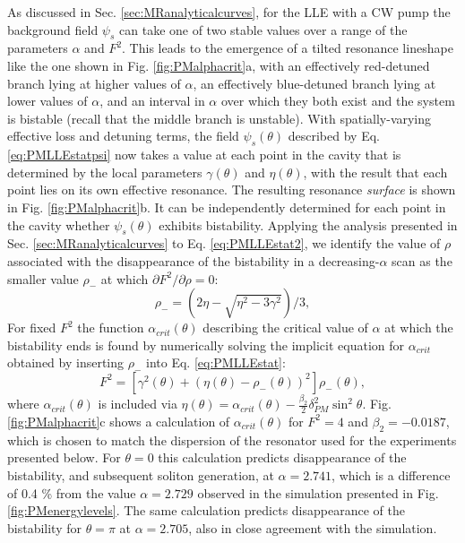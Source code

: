As discussed in Sec. \ref{sec:MRanalyticalcurves}, for the LLE with a CW pump the background field $\psi_s$ can take one of two stable values over a range of the parameters $\alpha$ and $F^2$. This leads to the emergence of a tilted resonance lineshape like the one shown in Fig. \ref{fig:PMalphacrit}a, with an effectively red-detuned branch lying at higher values of $\alpha$, an effectively blue-detuned branch lying at lower values of $\alpha$, and an interval in $\alpha$ over which they both exist and the system is bistable (recall that the middle branch is unstable). With spatially-varying effective loss and detuning terms, the field $\psi_s(\theta)$ described by Eq. \ref{eq:PMLLEstatpsi} now takes a value at each point in the cavity that is determined by the local parameters $\gamma(\theta)$ and $\eta(\theta)$, with the result that each point lies on its own effective resonance. The resulting resonance \textit{surface} is shown in Fig. \ref{fig:PMalphacrit}b. It can be independently determined for each point in the cavity whether $\psi_s(\theta)$ exhibits bistability. Applying the analysis presented in Sec. \ref{sec:MRanalyticalcurves} to Eq. \ref{eq:PMLLEstat2}, we identify the value of $\rho$ associated with the disappearance of the bistability in a decreasing-$\alpha$ scan as the smaller value $\rho_-$ at which $\partial F^2/\partial\rho=0$:
\begin{equation}
\rho_-=\left(2\eta-\sqrt{\eta^2-3\gamma^2}\right)/3,
\end{equation}
For fixed $F^2$ the function $\alpha_{crit}(\theta)$ describing the critical value of $\alpha$ at which the bistability ends is found by numerically solving the implicit equation for $\alpha_{crit}$ obtained by inserting $\rho_-$ into Eq. \ref{eq:PMLLEstat}:
\begin{equation}
F^2=\left[\gamma^2(\theta)+\left(\eta(\theta)-\rho_-(\theta)\right)^2\right]\rho_-(\theta),
\end{equation}
where $\alpha_{crit}(\theta)$ is included via $\eta(\theta)=\alpha_{crit}(\theta)-\frac{\beta_2}{2}\delta_{PM}^2\sin^2{\theta}$. Fig. \ref{fig:PMalphacrit}c shows a calculation of $\alpha_{crit}(\theta)$ for $F^2=4$ and $\beta_2=-0.0187$, which is chosen to match the dispersion of the resonator used for the experiments presented below. For $\theta=0$ this calculation predicts disappearance of the bistability, and subsequent soliton generation, at $\alpha=2.741$, which is a difference of 0.4 \% from the value $\alpha=2.729$ observed in the simulation presented in Fig. \ref{fig:PMenergylevels}. The same calculation predicts disappearance of the bistability for $\theta=\pi$ at $\alpha=2.705$, also in close agreement with the simulation.



